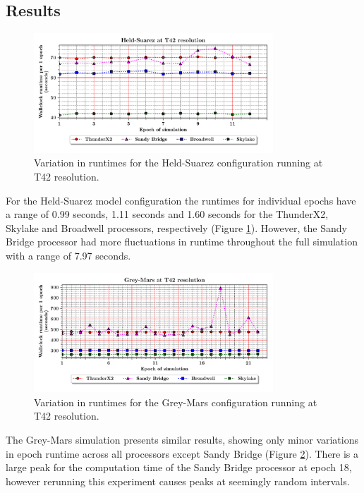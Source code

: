 \documentclass[a4paper,11pt]{report}
\begin{document}
\subsection{Results}
\begin{figure}[htbp]
\begin{center}
\includegraphics[width=0.8\textwidth]{img/held_suarez-variation.pdf}
\caption{Variation in runtimes for the Held-Suarez configuration running at T42 resolution.}
\label{fig:variation-comparison-held-t42}
\end{center}
\end{figure}
For the Held-Suarez model configuration the runtimes for individual epochs have a range of 0.99 seconds, 1.11 seconds and 1.60 seconds for the ThunderX2, Skylake and Broadwell processors, respectively (Figure \ref{fig:variation-comparison-held-t42}). However, the Sandy Bridge processor had more fluctuations in runtime throughout the full simulation with a range of 7.97 seconds.
\begin{figure}[htbp]
\begin{center}
\includegraphics[width=0.8\textwidth]{img/grey_mars-variation.pdf}
\caption{Variation in runtimes for the Grey-Mars configuration running at T42 resolution.}
\label{fig:variation-comparison-mars-t42}
\end{center}
\end{figure}
\par
The Grey-Mars simulation presents similar results, showing only minor variations in epoch runtime across all processors except Sandy Bridge (Figure \ref{fig:variation-comparison-mars-t42}). There is a large peak for the computation time of the Sandy Bridge processor at epoch 18, however rerunning this experiment causes peaks at seemingly random intervals.
\end{document}

